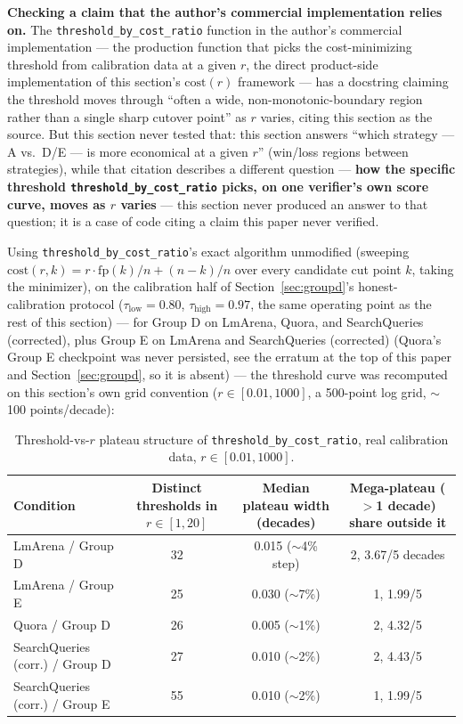 \documentclass[11pt]{article}
\newcommand{\taulow}{\ensuremath{\tau_{\text{low}}}}
\newenvironment{fittab}{\begin{lrbox}{\fittabbox}}{\end{lrbox}%
  \ifdim\wd\fittabbox>\linewidth\resizebox{\linewidth}{!}{\usebox{\fittabbox}}\else\usebox{\fittabbox}\fi}
\newcommand{\tauhigh}{\ensuremath{\tau_{\text{high}}}}
\begin{document}
\textbf{Checking a claim that the author's commercial implementation relies on.} The \texttt{threshold\_\allowbreak{}by\_\allowbreak{}cost\_\allowbreak{}ratio} function in the author's commercial implementation --- the production function that picks the cost-minimizing threshold from calibration data at a given $r$, the direct product-side implementation of this section's $\mathrm{cost}(r)$ framework --- has a docstring claiming the threshold moves through ``often a wide, non-monotonic-boundary region rather than a single sharp cutover point'' as $r$ varies, citing this section as the source. But this section never tested that: this section answers ``which strategy --- A vs.\ D/E --- is more economical at a given $r$'' (win/loss regions between strategies), while that citation describes a different question --- \textbf{how the specific threshold \texttt{threshold\_\allowbreak{}by\_\allowbreak{}cost\_\allowbreak{}ratio} picks, on one verifier's own score curve, moves as $r$ varies} --- this section never produced an answer to that question; it is a case of code citing a claim this paper never verified.

Using \texttt{threshold\_\allowbreak{}by\_\allowbreak{}cost\_\allowbreak{}ratio}'s exact algorithm unmodified (sweeping $\mathrm{cost}(r,k) = r{\cdot}\mathrm{fp}(k)/n + (n-k)/n$ over every candidate cut point $k$, taking the minimizer), on the calibration half of Section~\ref{sec:groupd}'s honest-calibration protocol ($\taulow=0.80$, $\tauhigh=0.97$, the same operating point as the rest of this section) --- for Group D on LmArena, Quora, and SearchQueries (corrected), plus Group E on LmArena and SearchQueries (corrected) (Quora's Group E checkpoint was never persisted, see the erratum at the top of this paper and Section~\ref{sec:groupd}, so it is absent) --- the threshold curve was recomputed on this section's own grid convention ($r \in [0.01, 1000]$, a 500-point log grid, $\sim$100 points/decade):

\begin{table}[h]
\centering
\small
\begin{fittab}\begin{tabular}{@{}p{5.3cm}ccc@{}}
\toprule
\textbf{Condition} & \textbf{Distinct thresholds in $r\in[1,20]$} & \textbf{Median plateau width (decades)} & \textbf{Mega-plateau ($>$1 decade) share outside it} \\
\midrule
LmArena / Group D & 32 & 0.015 ($\sim$4\% step) & 2, 3.67/5 decades \\
LmArena / Group E & 25 & 0.030 ($\sim$7\%) & 1, 1.99/5 \\
Quora / Group D & 26 & 0.005 ($\sim$1\%) & 2, 4.32/5 \\
SearchQueries (corr.) / Group D & 27 & 0.010 ($\sim$2\%) & 2, 4.43/5 \\
SearchQueries (corr.) / Group E & 55 & 0.010 ($\sim$2\%) & 1, 1.99/5 \\
\bottomrule
\end{tabular}\end{fittab}
\caption{Threshold-vs-$r$ plateau structure of \texttt{threshold\_\allowbreak{}by\_\allowbreak{}cost\_\allowbreak{}ratio}, real calibration data, $r\in[0.01,1000]$.}
\end{table}
\end{document}
